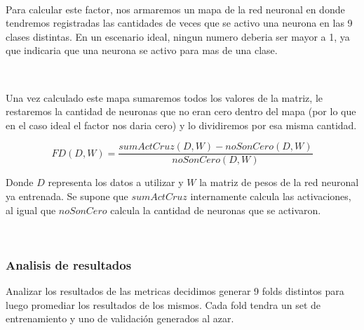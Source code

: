 \documentclass[informe.tex]{subfiles}
\begin{document}
      ~
      
      Para calcular este factor, nos armaremos un mapa de la red neuronal en donde tendremos registradas las cantidades de veces que se activo una neurona en las 9 clases distintas. En un escenario ideal, ningun numero deberia ser mayor a 1, ya que indicaria que una neurona se activo para mas de una clase.
      
      ~
      
      Una vez calculado este mapa sumaremos todos los valores de la matriz, le restaremos la cantidad de neuronas que no eran cero dentro del mapa (por lo que en el caso ideal el factor nos daria cero) y lo dividiremos por esa misma cantidad.
      
      $$FD(D, W) = \frac{sumActCruz(D, W) - noSonCero(D, W)}{noSonCero(D, W)}$$
      
      Donde $D$ representa los datos a utilizar y $W$ la matriz de pesos de la red neuronal ya entrenada. Se supone que $sumActCruz$ internamente calcula las activaciones, al igual que $noSonCero$ calcula la cantidad de neuronas que se activaron.
      
      ~
      \subsubsection{Analisis de resultados}
      Analizar los resultados de las metricas decidimos generar 9 folds distintos para luego promediar los resultados de los mismos. Cada fold tendra un set de entrenamiento y uno de validación generados al azar.
    
      
      
\end{document}
